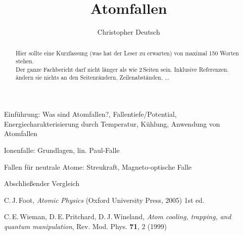 \documentclass[twocolumn]{revtex4}
\begin{document}
\title{Atomfallen}

\author{Christopher Deutsch}




\begin{abstract}
%
Hier sollte eine Kurzfassung (was hat der Leser zu erwarten) von maximal 150 Worten stehen.
\\
Der ganze Fachbericht darf nicht länger als wie 2\,Seiten sein. Inklusive Referenzen. ändern sie nichts an den Seitenrändern, Zeilenabständen, ...
%
\end{abstract}

\maketitle

Einführung: Was sind Atomfallen?, Fallentiefe/Potential, Energiecharakterisierung durch Temperatur, Kühlung, Anwendung von Atomfallen

Ionenfalle: Grundlagen, lin. Paul-Falle

Fallen für neutrale Atome: Streukraft, Magneto-optische Falle

Abschließender Vergleich


\begin{thebibliography}{}
C.\,J.\,Foot, {\it Atomic Physics} (Oxford University Press, 2005) 1st ed.

C.\,E.\,Wieman, D.\,E.\,Pritchard, D.\,J.\,Wineland, {\it Atom cooling, trapping, and quantum manipulation}, Rev. Mod. Phys. \textbf{71}, 2 (1999)

\end{thebibliography}
\end{document}
